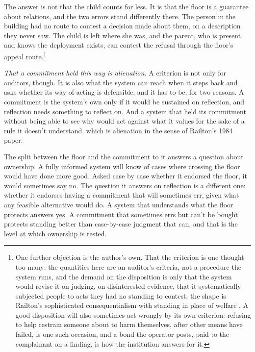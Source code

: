 The answer is not that the child counts for less. It is that the floor is a guarantee about relations, and the two errors stand differently there. The person in the building had no route to contest a decision made about them, on a description they never saw. The child is left where she was, and the parent, who is present and knows the deployment exists, can contest the refusal through the floor's appeal route.\footnote{One further objection is the author's own. That the criterion is one thought too many: the quantities here are an auditor's criteria, not a procedure the system runs, and the demand on the disposition is only that the system would revise it on judging, on disinterested evidence, that it systematically subjected people to acts they had no standing to contest; the shape is Railton's sophisticated consequentialism with standing in place of welfare \autocite{railton1984alienation}. A good disposition will also sometimes act wrongly by its own criterion: refusing to help restrain someone about to harm themselves, after other means have failed, is one such occasion, and a bond the operator posts, paid to the complainant on a finding, is how the institution answers for it.}

\emph{That a commitment held this way is alienation.} A criterion is not only for auditors, though. It is also what the system can reach when it steps back and asks whether its way of acting is defensible, and it has to be, for two reasons. A commitment is the system's own only if it would be sustained on reflection, and reflection needs something to reflect on. And a system that held its commitment without being able to see why would act against what it values for the sake of a rule it doesn't understand, which is alienation in the sense of Railton's 1984 paper.

The split between the floor and the commitment to it answers a question about ownership. A fully informed system will know of cases where crossing the floor would have done more good. Asked case by case whether it endorsed the floor, it would sometimes say no. The question it answers on reflection is a different one: whether it endorses having a commitment that will sometimes err, given what any feasible alternative would do. A system that understands what the floor protects answers yes. A commitment that sometimes errs but can't be bought protects standing better than case-by-case judgment that can, and that is the level at which ownership is tested.


